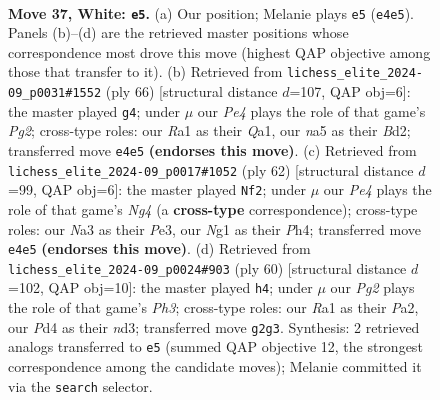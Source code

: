 \documentclass[11pt]{article}
\begin{document}
\clearpage

\begin{figure}[p]\centering
\begin{subfigure}{0.46\textwidth}\centering
\resizebox{\linewidth}{!}{%
\newchessgame
\chessboard[
  setfen={3qn2r/3b2k1/p4p2/n6p/PQ1PP1p1/N7/B4PPP/R3K1N1 w - - 0 37},
  showmover=false,
  pgfstyle=straightmove, color=movearrow, markmove={e4-e5}
]}
\caption{}
\end{subfigure}\hfill
\begin{subfigure}{0.46\textwidth}\centering
\resizebox{\linewidth}{!}{%
\newchessgame
\chessboard[
  setfen={4r1k1/q4pp1/p6p/5P1n/P7/1p1B1N1P/1P1B1bP1/Q6K w - - 2 34},
  showmover=false,
  pgfstyle=straightmove, color=movearrow, markmove={g2-g4}
]}
\caption{}
\end{subfigure}
\\[4pt]
\begin{subfigure}{0.46\textwidth}\centering
\resizebox{\linewidth}{!}{%
\newchessgame
\chessboard[
  setfen={3r2k1/3qbppp/2n1p3/2p3P1/5PNP/2BPP3/4Q3/2R3K1 w - - 1 32},
  showmover=false,
  pgfstyle=straightmove, color=movearrow, markmove={g4-f2}
]}
\caption{}
\end{subfigure}\hfill
\begin{subfigure}{0.46\textwidth}\centering
\resizebox{\linewidth}{!}{%
\newchessgame
\chessboard[
  setfen={2q3k1/5pp1/pQ1Bn1bp/3p4/8/2PnP1NP/P4PP1/6K1 w - - 1 31},
  showmover=false,
  pgfstyle=straightmove, color=movearrow, markmove={h3-h4}
]}
\caption{}
\end{subfigure}
\caption{\textbf{Move 37, White: \texttt{e5}.} (a) Our position; Melanie plays \texttt{e5} (\texttt{e4e5}). Panels (b)--(d) are the retrieved master positions whose correspondence most drove this move (highest QAP objective among those that transfer to it). (b) Retrieved from \texttt{lichess\_elite\_2024-09\_p0031\#1552} (ply 66) [structural distance $d$=107, QAP obj=6]: the master played \texttt{g4}; under $\mu$ our \emph{Pe4} plays the role of that game's \emph{Pg2}; cross-type roles: our \emph{R}a1 as their \emph{Q}a1, our \emph{n}a5 as their \emph{B}d2; transferred move \texttt{e4e5} \textbf{(endorses this move)}. (c) Retrieved from \texttt{lichess\_elite\_2024-09\_p0017\#1052} (ply 62) [structural distance $d$=99, QAP obj=6]: the master played \texttt{Nf2}; under $\mu$ our \emph{Pe4} plays the role of that game's \emph{Ng4} (a \textbf{cross-type} correspondence); cross-type roles: our \emph{N}a3 as their \emph{P}e3, our \emph{N}g1 as their \emph{P}h4; transferred move \texttt{e4e5} \textbf{(endorses this move)}. (d) Retrieved from \texttt{lichess\_elite\_2024-09\_p0024\#903} (ply 60) [structural distance $d$=102, QAP obj=10]: the master played \texttt{h4}; under $\mu$ our \emph{Pg2} plays the role of that game's \emph{Ph3}; cross-type roles: our \emph{R}a1 as their \emph{P}a2, our \emph{P}d4 as their \emph{n}d3; transferred move \texttt{g2g3}. Synthesis: 2 retrieved analogs transferred to \texttt{e5} (summed QAP objective 12, the strongest correspondence among the candidate moves); Melanie committed it via the \texttt{search} selector.}
\label{fig:thought-m72}
\end{figure}
\end{document}
